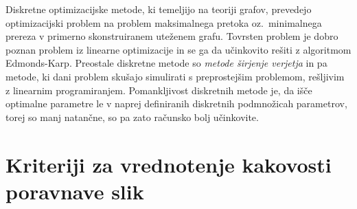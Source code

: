 \documentclass[journal]{IEEEtran}
\begin{document}
Diskretne optimizacijske metode, ki temeljijo na teoriji grafov, prevedejo optimizacijski problem na problem maksimalnega pretoka oz.~minimalnega prereza v primerno skonstruiranem uteženem grafu. Tovrsten problem je dobro poznan problem iz linearne optimizacije in se ga da učinkovito rešiti z algoritmom Edmonds-Karp. Preostale diskretne metode so \emph{metode širjenje verjetja} in pa metode, ki dani problem skušajo simulirati s preprostejšim problemom, rešljivim z linearnim programiranjem. Pomankljivost diskretnih metode je, da išče optimalne parametre le v naprej definiranih diskretnih podmnožicah parametrov, torej so manj natančne, so pa zato računsko bolj učinkovite.


\section{Kriteriji za vrednotenje kakovosti poravnave slik}


\begin{comment}
Za kvantitativno ovrednotenje kvalitete poravnave se uporablja več različnih kriterijev. Med najpogosteje uporabljenimi sta mera DICE (angl. DICE similarity measure) ter modificirana Hausdorffova razdalja, ki računa razdaljo med ploskvami segmentiranih anatomskih struktur:
\begin{equation}
 H = frac{1}{n}\min_{x\in A,\ y\in B} d(x,y)
\end{equation}
Mera DICE je izražena z enačbo
\begin{equation}
 D = \frac{|A\cap B|}{2(|A| + |B|)},
\end{equation}
kjer $|\cdot|$ označuje moč množice, $A$ je množica vokslov, ki pipada prvi segmentirani anatomski strukturi, $B$ pa je množica vokslov, ki pipada drugi anatomski strukturi. DICE doseže vrednost 1,
ko se anatomski strukturi na sliki popolnoma prekrivata, nižje vrednosti pa pomenijo slabšo poravnavo. Hausdorffova razdalja pa doseže nizke vrednosti za popolne poravnave ter višje vrednosti za nepopolne; idealno je 0. Rezultati v meri dice se lahko precej razlikujejo glede na različne anatomske strukture. Za strukture, ki imajo večje razmerje med površino in volumnom (npr. hrbtenjača) je značilno, da je mera dice nekoliko nižja, zato tu ne gre pričakovati visokih rezultatov. Za tovrstne anatomske strukture je bolje uporabiti Hausdorffovo razdaljo.
\end{comment}
\end{document}
